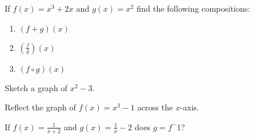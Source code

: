 \documentclass[addpoints,12pt]{exam}
\begin{document}
\begin{questions}
\vspace{1.5in}
	\question[30] If $f(x)=x^3+2x$ and $g(x)=x^2$ find the following compositions:
    \begin{enumerate}
    \item $(f+g)(x)$
    \vspace{.5in}
    \item $(\frac{f}{g})(x)$
    \vspace{.5in}
    \item $(f \circ g)(x)$
    \end{enumerate}
\newpage
	\question[10] Sketch a graph of $x^2-3$.
    	
\vspace{1.5in}
	\question[10] Reflect the graph of $f(x)=x^3-1$ across the $x$-axis.
    
\vspace{1.5in}
	\question[10] If $f(x)=\frac{1}{x+2}$ and $g(x)=\frac{1}{x}-2$ does $g=f^-1$?
\end{questions}
\end{document}
